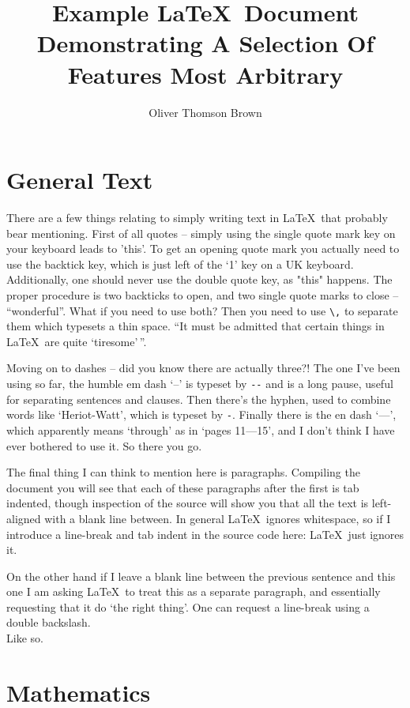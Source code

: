 \documentclass[a4paper,11pt,twoside]{article}		%
\author{Oliver Thomson Brown}
\title{\textbf{Example \LaTeX\ Document} \\ {\Fontamici Demonstrating A Selection Of Features Most Arbitrary}}
\date{}
\begin{document}
\maketitle

\tableofcontents

\section{General Text}
\label{sec:1}

There are a few things relating to simply writing text in \LaTeX\ that probably bear mentioning. First of all quotes -- simply using the single quote mark key on your keyboard leads to 'this'. To get an opening quote mark you actually need to use the backtick key, which is just left of the `1' key on a UK keyboard. Additionally, one should never use the double quote key, as "this" happens. The proper procedure is two backticks to open, and two single quote marks to close -- ``wonderful''. What if you need to use both? Then you need to use \verb:\,: to separate them which typesets a thin space. ``It must be admitted that certain things in \LaTeX\ are quite `tiresome'\,''.

Moving on to dashes -- did you know there are actually three?! The one I've been using so far, the humble em dash `--' is typeset by \verb:--: and is a long pause, useful for separating sentences and clauses. Then there's the hyphen, used to combine words like `Heriot-Watt', which is typeset by \verb:-:. Finally there is the en dash `---', which apparently means `through' as in `pages 11---15', and I don't think I have ever bothered to use it. So there you go.

The final thing I can think to mention here is paragraphs. Compiling the document you will see that each of these paragraphs after the first is tab indented, though inspection of the source will show you that all the text is left-aligned with a blank line between. In general \LaTeX\ ignores whitespace, so if I introduce a line-break and tab indent in the source code here:
	\LaTeX\ just ignores it.

On the other hand if I leave a blank line between the previous sentence and this one I am asking \LaTeX\ to treat this as a separate paragraph, and essentially requesting that it do `the right thing'. One can request a line-break using a double backslash.\\ Like so. 

\section{Mathematics}
\label{sec:2}
\end{document}
